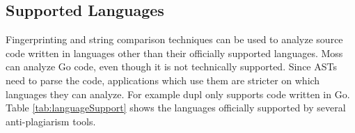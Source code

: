 \documentclass[12pt]{article}
\begin{document}
				\begin{figure}
					\begin{floatrow}
							
					\end{floatrow}
				\end{figure}
		
		\subsection{Supported Languages}
			Fingerprinting and string comparison techniques can be used to analyze source code written in languages other than their officially supported languages. Moss can analyze Go code, even though it is not technically supported. Since ASTs need to parse the code, applications which use them are stricter on which languages they can analyze. For example dupl only supports code written in Go. Table \ref{tab:languageSupport} shows the languages officially supported by several anti-plagiarism tools.
		
\end{document}
